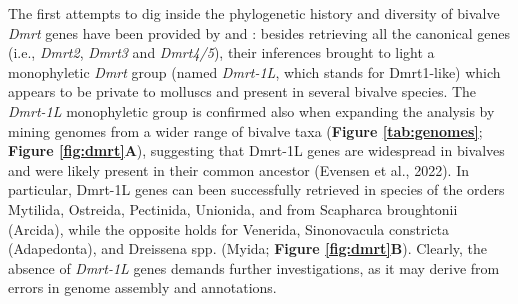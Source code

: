 \documentclass[../main.tex]{subfiles}
\begin{document}
The first attempts to dig inside the phylogenetic history and diversity of bivalve \textit{Dmrt} genes have been provided by \textbf{\cite{li2018foxl2}} and \textbf{\cite{evensen2022comparative}}: besides retrieving all the canonical genes (i.e., \textit{Dmrt2}, \textit{Dmrt3} and \textit{Dmrt4/5}), their inferences brought to light a monophyletic \textit{Dmrt} group (named \textit{Dmrt-1L}, which stands for Dmrt1-like) which appears to be private to molluscs and present in several bivalve species. The \textit{Dmrt-1L} monophyletic group is confirmed also when expanding the analysis by mining genomes from a wider range of bivalve taxa (\textbf{Figure \ref{tab:genomes}}; \textbf{Figure \ref{fig:dmrt}A}), suggesting that Dmrt-1L genes are widespread in bivalves and were likely present in their common ancestor (Evensen et al., 2022). In particular, Dmrt-1L genes can been successfully retrieved in species of the orders Mytilida, Ostreida, Pectinida, Unionida, and from Scapharca broughtonii (Arcida), while the opposite holds for Venerida, Sinonovacula constricta (Adapedonta), and Dreissena spp. (Myida; \textbf{Figure \ref{fig:dmrt}B}). Clearly, the absence of \textit{Dmrt-1L} genes demands further investigations, as it may derive from errors in genome assembly and annotations.
\end{document}
